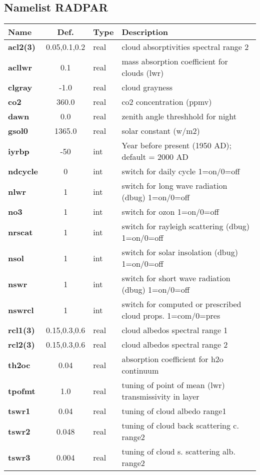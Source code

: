   
\subsection{Namelist RADPAR}
\begin{tabular}{|l|c|l|l|}                                  
\hline                                                        
Name   & Def. & Type & Description \\               
\hline                                                        
{\bf acl2(3) } & 0.05,0.1,0.2 & real & cloud absorptivities spectral range 2 \\
{\bf acllwr  } & 0.1 & real & mass absorption coefficient for clouds (lwr) \\
{\bf clgray  } & -1.0 & real & cloud grayness \\
{\bf co2     } & 360.0 & real & co2 concentration (ppmv) \\
{\bf dawn    } & 0.0 & real & zenith angle threshhold for night \\
{\bf gsol0   } & 1365.0 & real & solar constant (w/m2) \\
{\bf iyrbp   } & -50 & int & Year before present (1950 AD); default = 2000 AD \\
{\bf ndcycle } & 0 & int & switch for daily cycle 1=on/0=off \\
{\bf nlwr    } & 1 & int & switch for long wave radiation (dbug) 1=on/0=off \\
{\bf no3     } & 1 & int & switch for ozon 1=on/0=off \\
{\bf nrscat  } & 1 & int & switch for rayleigh scattering (dbug) 1=on/0=off \\
{\bf nsol    } & 1 & int & switch for solar insolation (dbug) 1=on/0=off \\
{\bf nswr    } & 1 & int & switch for short wave radiation (dbug) 1=on/0=off \\
{\bf nswrcl  } & 1 & int & switch for computed or prescribed cloud props. 1=com/0=pres \\
{\bf rcl1(3) } & 0.15,0.3,0.6 & real & cloud albedos spectral range 1 \\
{\bf rcl2(3) } & 0.15,0.3,0.6 & real & cloud albedos spectral range 2 \\
{\bf th2oc   } & 0.04 & real & absorption coefficient for h2o continuum \\
{\bf tpofmt  } & 1.0 & real & tuning of point of mean (lwr) transmissivity in layer \\
{\bf tswr1   } & 0.04 & real & tuning of cloud albedo range1 \\
{\bf tswr2   } & 0.048 & real & tuning of cloud back scattering c. range2 \\
{\bf tswr3   } & 0.004 & real & tuning of cloud s. scattering alb. range2 \\
\hline                                                        
\end{tabular}


